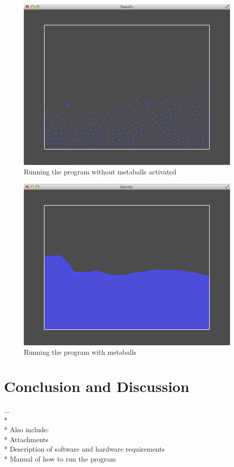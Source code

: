 \documentclass[a4paper,12pt,twoside]{report}
\begin{document}
\begin{figure}[h]
\begin{center}
    \includegraphics[width=11cm]{figs/image_2.png} 
\end{center}
\caption{Running the program without metaballs activated}
\label{model_block}
\end{figure}

\newpage{}

\begin{figure}[t]
\begin{center}
    \includegraphics[width=11cm]{figs/image_1.png} 
\end{center}
\caption{Running the program with metaballs}
\label{model_block}
\end{figure}


\chapter{Conclusion and Discussion}
...\\* \\*
Also include:\\*
Attachments\\*
Description of software and hardware requirements\\*
Manual of how to run the program
\end{document}
